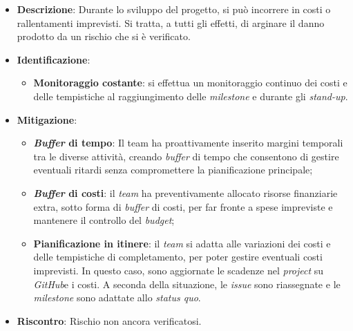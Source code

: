 \label{risk:costi e tempi imprevisti}
\begin{itemize}
	\item \textbf{Descrizione}:
	      Durante lo sviluppo del progetto, si può incorrere in costi o
	      rallentamenti imprevisti. Si tratta, a tutti gli effetti, di arginare
	      il danno prodotto da un rischio che si è verificato.
	\item \textbf{Identificazione}:
	      \begin{itemize}
		      \item \textbf{Monitoraggio costante}: si effettua un monitoraggio 
			  		continuo dei costi e delle tempistiche al raggiungimento delle 
					\textit{milestone} e durante gli \textit{stand-up}.
			  
	      \end{itemize}
	\item \textbf{Mitigazione}:
	      \begin{itemize}
		      \item \textbf{\textit{Buffer} di tempo}: Il team ha proattivamente 
			  		inserito margini temporali tra le diverse attività, creando 
					\textit{buffer} di tempo che consentono di gestire eventuali 
					ritardi senza compromettere la pianificazione principale;

		      \item \textbf{\textit{Buffer} di costi}: il \textit{team} ha 
			  		preventivamente allocato risorse finanziarie extra, 
					sotto forma di \textit{buffer} di costi, per far fronte 
					a spese impreviste e mantenere il controllo del \textit{budget};

		      \item \textbf{Pianificazione in itinere}: il \textit{team} si adatta
		            alle variazioni dei costi e delle tempistiche di
		            completamento, per poter gestire eventuali costi
		            imprevisti. In questo caso, sono aggiornate le scadenze
		            nel \textit{project} su \textit{GitHub}\g e i costi.
		            A seconda della situazione, le \textit{issue} sono
		            riassegnate e le \textit{milestone} sono adattate allo
		            \textit{status quo}.
	      \end{itemize}
	\item \textbf{Riscontro}: Rischio non ancora verificatosi.
\end{itemize}
